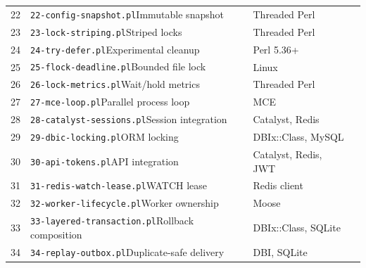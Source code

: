 \begin{longtable}{L{.06\linewidth}L{.41\linewidth}L{.31\linewidth}L{.08\linewidth}}
22 & \nolinkurl{22-config-snapshot.pl}\newline Immutable snapshot & Threaded Perl & \pageref{listing:examples/22-config-snapshot.pl}\\
23 & \nolinkurl{23-lock-striping.pl}\newline Striped locks & Threaded Perl & \pageref{listing:examples/23-lock-striping.pl}\\
24 & \nolinkurl{24-try-defer.pl}\newline Experimental cleanup & Perl 5.36+ & \pageref{listing:examples/24-try-defer.pl}\\
25 & \nolinkurl{25-flock-deadline.pl}\newline Bounded file lock & Linux & \pageref{listing:examples/25-flock-deadline.pl}\\
26 & \nolinkurl{26-lock-metrics.pl}\newline Wait/hold metrics & Threaded Perl & \pageref{listing:examples/26-lock-metrics.pl}\\
27 & \nolinkurl{27-mce-loop.pl}\newline Parallel process loop & MCE & \pageref{listing:examples/27-mce-loop.pl}\\
28 & \nolinkurl{28-catalyst-sessions.pl}\newline Session integration & Catalyst, Redis & \pageref{listing:examples/28-catalyst-sessions.pl}\\
29 & \nolinkurl{29-dbic-locking.pl}\newline ORM locking & DBIx::Class, MySQL & \pageref{listing:examples/29-dbic-locking.pl}\\
30 & \nolinkurl{30-api-tokens.pl}\newline API integration & Catalyst, Redis, JWT & \pageref{listing:examples/30-api-tokens.pl}\\
31 & \nolinkurl{31-redis-watch-lease.pl}\newline WATCH lease & Redis client & \pageref{listing:examples/31-redis-watch-lease.pl}\\
32 & \nolinkurl{32-worker-lifecycle.pl}\newline Worker ownership & Moose & \pageref{listing:examples/32-worker-lifecycle.pl}\\
33 & \nolinkurl{33-layered-transaction.pl}\newline Rollback composition & DBIx::Class, SQLite & \pageref{listing:examples/33-layered-transaction.pl}\\
34 & \nolinkurl{34-replay-outbox.pl}\newline Duplicate-safe delivery & DBI, SQLite & \pageref{listing:examples/34-replay-outbox.pl}\\

\end{longtable}

